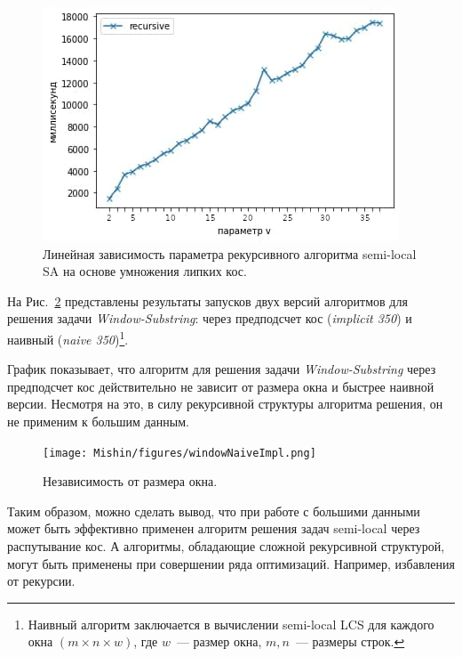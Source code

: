\begin{figure}[t!]
\centering
    \includegraphics[width=0.8\columnwidth]{Mishin/figures/vDependenceImplicitSemiLocalSARecursie.png}
    \caption{Линейная зависимость параметра рекурсивного алгоритма {semi-local SA} на основе умножения липких кос.}\label{fig:vParam}
\end{figure}

На Рис.~\ref{fig:speedWindow3} представлены результаты запусков двух версий алгоритмов для решения задачи \emph{Window-Substring}: через предподсчет кос (\emph{implicit 350}) и наивный (\emph{naive 350})\footnote{Наивный алгоритм заключается в вычислении {semi-local LCS} для каждого окна $(m \times n \times w)$, где $w$~--- размер окна, $m,n$~--- размеры строк.
}.

График  показывает, что алгоритм для решения задачи \emph{Window-Substring} через предподсчет кос действительно не зависит от размера окна и быстрее наивной версии.
Несмотря на это, в силу рекурсивной структуры  алгоритма решения, он не применим к большим данным.

\begin{figure}[t!]
\centering
    \texttt{[image: Mishin/figures/windowNaiveImpl.png]}
    \caption{Независимость от размера окна.}\label{fig:speedWindow3}
\end{figure}


Таким образом, можно сделать вывод, что  при работе с большими данными может быть эффективно применен алгоритм решения задач {semi-local} через распутывание кос. 
А алгоритмы, обладающие сложной рекурсивной структурой, могут быть применены при совершении ряда оптимизаций. Например, избавления от рекурсии.


